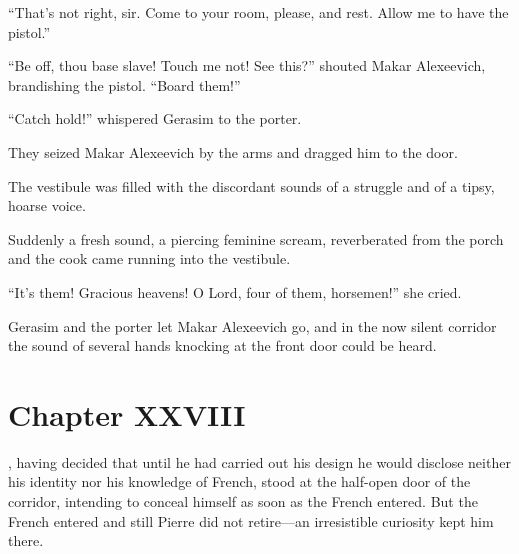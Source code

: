 ``That's not right, sir. Come to your room, please, and
rest. Allow me to have the pistol.''

``Be off, thou base slave! Touch me not! See this?'' shouted
Makar Alexeevich, brandishing the pistol. ``Board them!''

``Catch hold!'' whispered Gerasim to the porter.

They seized Makar Alexeevich by the arms and dragged him to the
door.

The vestibule was filled with the discordant sounds of a struggle
and of a tipsy, hoarse voice.

Suddenly a fresh sound, a piercing feminine scream, reverberated
from the porch and the cook came running into the vestibule.

``It's them! Gracious heavens! O Lord, four of them, horsemen!''
she cried.

Gerasim and the porter let Makar Alexeevich go, and in the now
silent corridor the sound of several hands knocking at the front
door could be heard.


\chapter*{Chapter XXVIII} \ifaudio {}
\fi

, having decided that until he had carried out his design
he would disclose neither his identity nor his knowledge of
French, stood at the half-open door of the corridor, intending to
conceal himself as soon as the French entered. But the French
entered and still Pierre did not retire---an irresistible
curiosity kept him there.

